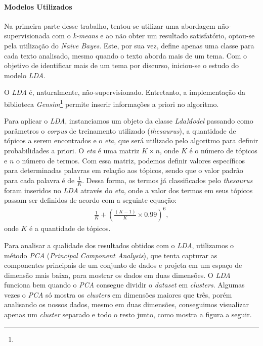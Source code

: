 \paragraph{Modelos Utilizados}

Na primeira parte desse trabalho, tentou-se utilizar uma abordagem não-supervisionada com o \textit{k-means} e ao não obter um resultado satisfatório, optou-se pela utilização do \textit{Naive Bayes}. Este, por sua vez, define apenas uma classe para cada texto analisado, mesmo quando o texto aborda mais de um tema. Com o objetivo de identificar mais de um tema por discurso, iniciou-se o estudo do modelo \textit{LDA}.

O \textit{LDA} é, naturalmente, não-supervisionado. Entretanto, a implementação da biblioteca \textit{Gensim}\footnote{} permite inserir informações a priori no algoritmo.

Para aplicar o \textit{LDA}, instanciamos um objeto da classe \textit{LdaModel} passando como parâmetros o \textit{corpus} de treinamento utilizado (\textit{thesaurus}), a quantidade de tópicos a serem encontrados e o \textit{eta}, que será utilizado pelo algoritmo para definir probabilidades a priori. O \textit{eta} é uma matriz \(K \times n\), onde \(K\) é o número de tópicos e \(n\) o número de termos. Com essa matriz, podemos definir valores específicos para determinadas palavras em relação aos tópicos, sendo que o valor padrão para cada palavra é de \(\frac{1}{K}\). Dessa forma, os termos já classificados pelo \textit{thesaurus} foram inseridos no \textit{LDA} através do \textit{eta}, onde a valor dos termos em seus tópicos passam ser definidos de acordo com a seguinte equação:
\begin{align}
  \frac{1}{K}+\left(\frac{(K-1)}{K} \times 0.99\right)^6,
\end{align}
onde \(K\) é a quantidade de tópicos.

Para analisar a qualidade dos resultados obtidos com o \textit{LDA}, utilizamos o método \textit{PCA} (\textit{Principal Component Analysis}), que tenta capturar as componentes principais de um conjunto de dados e projeta em um espaço de dimensão mais baixa, para mostrar os dados em duas dimensões. O \textit{LDA} funciona bem quando o \textit{PCA} consegue dividir o \textit{dataset} em \textit{clusters}. Algumas vezes o \textit{PCA} só mostra os \textit{clusters} em dimensões maiores que três, porém analisando os nossos dados, mesmo em duas dimensões, conseguimos visualizar apenas um \textit{cluster} separado e todo o resto junto, como mostra a figura a seguir.

